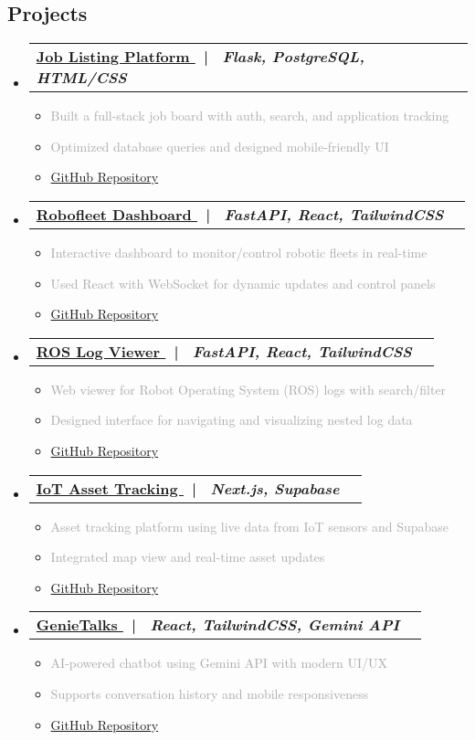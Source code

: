 \documentclass[letterpaper,11pt]{article}
\makeatletter
\newcommand{\customitem}{\item[\color{mainblue}\ding{2}]}
\newcommand{\resumeItem}[1]{\customitem\small{#1 \vspace{-1pt}}}
\newcommand{\resumeProjectHeading}[2]{
  \item
  \begin{tabular*}{0.97\textwidth}{l@{\extracolsep{\fill}}r}
    \small\textbf{\color{darkgray}#1} & #2 \\
  \end{tabular*}\vspace{-2pt}
}
\newcommand{\resumeSubHeadingListStart}{\begin{itemize}[leftmargin=0.15in, label={}, itemsep=6pt]}
\newcommand{\resumeSubHeadingListEnd}{\end{itemize}}
\newcommand{\resumeItemListStart}{\begin{itemize}[leftmargin=0.15in, label={}, itemsep=3pt]}
\newcommand{\resumeItemListEnd}{\end{itemize}\vspace{-2pt}}
\makeatother
\begin{document}
\begin{paracol}{2}
\section{Projects}
\resumeSubHeadingListStart
  \resumeProjectHeading
    {\textbf{\href{https://jovian-alpha.vercel.app/}{Job Listing Platform \faExternalLink}} \ \textcolor{mainblue}{|} \ \footnotesize\emph{Flask, PostgreSQL, HTML/CSS}}{}
  \resumeItemListStart
    \resumeItem{\textcolor{darkgray}{Built a full-stack job board with auth, search, and application tracking}}
    \resumeItem{\textcolor{darkgray}{Optimized database queries and designed mobile-friendly UI}}
    \resumeItem{\href{https://github.com/aayushsiwa/jovian}{\textcolor{mainblue}{\faGithub} GitHub Repository}}
  \resumeItemListEnd
  \resumeProjectHeading
    {\textbf{\href{https://robofleet-dashboard.vercel.app}{Robofleet Dashboard \faExternalLink}} \ \textcolor{mainblue}{|} \ \footnotesize\emph{FastAPI, React, TailwindCSS}}{}
  \resumeItemListStart
    \resumeItem{\textcolor{darkgray}{Interactive dashboard to monitor/control robotic fleets in real-time}}
    \resumeItem{\textcolor{darkgray}{Used React with WebSocket for dynamic updates and control panels}}
    \resumeItem{\href{https://github.com/aayushsiwa/robofleet-dashboard}{\textcolor{mainblue}{\faGithub} GitHub Repository}}
  \resumeItemListEnd
  \resumeProjectHeading
    {\textbf{\href{https://ros-log-viewer-as.vercel.app/}{ROS Log Viewer \faExternalLink}} \ \textcolor{mainblue}{|} \ \footnotesize\emph{FastAPI, React, TailwindCSS}}{}
  \resumeItemListStart
    \resumeItem{\textcolor{darkgray}{Web viewer for Robot Operating System (ROS) logs with search/filter}}
    \resumeItem{\textcolor{darkgray}{Designed interface for navigating and visualizing nested log data}}
    \resumeItem{\href{https://github.com/aayushsiwa/ros-log-viewer}{\textcolor{mainblue}{\faGithub} GitHub Repository}}
  \resumeItemListEnd
  \resumeProjectHeading
    {\textbf{\href{https://iot-asset-tracking.vercel.app/}{IoT Asset Tracking \faExternalLink}} \ \textcolor{mainblue}{|} \ \footnotesize\emph{Next.js, Supabase}}{}
  \resumeItemListStart
    \resumeItem{\textcolor{darkgray}{Asset tracking platform using live data from IoT sensors and Supabase}}
    \resumeItem{\textcolor{darkgray}{Integrated map view and real-time asset updates}}
    \resumeItem{\href{https://github.com/aayushsiwa/iot-asset-tracking}{\textcolor{mainblue}{\faGithub} GitHub Repository}}
  \resumeItemListEnd
  \resumeProjectHeading
    {\textbf{\href{https://genietalks.vercel.app}{GenieTalks \faExternalLink}} \ \textcolor{mainblue}{|} \ \footnotesize\emph{React, TailwindCSS, Gemini API}}{}
  \resumeItemListStart
    \resumeItem{\textcolor{darkgray}{AI-powered chatbot using Gemini API with modern UI/UX}}
    \resumeItem{\textcolor{darkgray}{Supports conversation history and mobile responsiveness}}
    \resumeItem{\href{https://github.com/aayushsiwa/genie-talks}{\textcolor{mainblue}{\faGithub} GitHub Repository}}
  \resumeItemListEnd
\resumeSubHeadingListEnd
\end{paracol}
\end{document}
